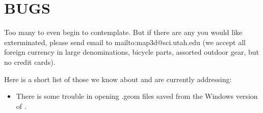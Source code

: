 
\section{BUGS}
\label{sec:bugs}

Too many to even begin to contemplate.  But if there are any you would like
exterminated, please send email to 
{mailto:map3d@sci.utah.edu} (we accept all foreign currency in large
denominations, bicycle parts, assorted outdoor gear, but no credit cards).

Here is a short list of those we know about and are currently addressing:

\begin{itemize}
  \item There is some trouble in opening .geom files saved from the Windows
    version of \map{}.
\end{itemize}

